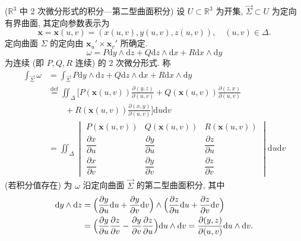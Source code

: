 \begin{definition}\label{def:11.3.4}
($\mathbb{R}^{3}$ 中 2 次微分形式的积分---第二型曲面积分) 设 $U\subset\mathbb{R}^{3}$ 为开集, $\overrightarrow{\Sigma}\subset U$ 为定向有界曲面, 其定向参数表示为
\[
\boldsymbol{x}=\boldsymbol{x}(u,v)=(x(u,v),y(u,v),z(u,v)),\quad(u,v)\in\Delta.
\]
定向曲面 $\Sigma$ 的定向由 $\boldsymbol{x}_{u}'\times\boldsymbol{x}_{v}'$ 所确定.
\[
\omega=P\mathrm{d}y\wedge\mathrm{d}z+Q\mathrm{d}z\wedge\mathrm{d}x+R\mathrm{d}x\wedge\mathrm{d}y
\]
为连续 (即 $P,Q,R$ 连续) 的 2 次微分形式. 称
\[
\begin{aligned}
\int_{\overrightarrow{\Sigma}}\omega&=\int_{\overrightarrow{\Sigma}}P\mathrm{d}y\wedge\mathrm{d}z+Q\mathrm{d}z\wedge\mathrm{d}x+R\mathrm{d}x\wedge\mathrm{d}y\\
&\overset{\text{def}}{=}\iint_{\Delta}\Biggl[P(\boldsymbol{x}(u,v))\frac{\partial(y,z)}{\partial(u,v)}+Q(\boldsymbol{x}(u,v))\frac{\partial(z,x)}{\partial(u,v)}\\
&\qquad+R(\boldsymbol{x}(u,v))\frac{\partial(x,y)}{\partial(u,v)}\Biggr]\mathrm{d}u\mathrm{d}v\\
&=\iint_{\Delta}
\begin{vmatrix}
P(\boldsymbol{x}(u,v))&Q(\boldsymbol{x}(u,v))&R(\boldsymbol{x}(u,v))\\
\dfrac{\partial x}{\partial u}&\dfrac{\partial y}{\partial u}&\dfrac{\partial z}{\partial u}\\[4pt]
\dfrac{\partial x}{\partial v}&\dfrac{\partial y}{\partial v}&\dfrac{\partial z}{\partial v}
\end{vmatrix}\mathrm{d}u\mathrm{d}v
\end{aligned}
\]
(若积分值存在) 为 $\omega$ 沿定向曲面 $\overrightarrow{\Sigma}$ 的第二型曲面积分, 其中
\[
\begin{aligned}
\mathrm{d}y\wedge\mathrm{d}z&=\Bigl(\frac{\partial y}{\partial u}\mathrm{d}u+\frac{\partial y}{\partial v}\mathrm{d}v\Bigr)\wedge\Bigl(\frac{\partial z}{\partial u}\mathrm{d}u+\frac{\partial z}{\partial v}\mathrm{d}v\Bigr)\\
&=\Bigl(\frac{\partial y}{\partial u}\frac{\partial z}{\partial v}-\frac{\partial y}{\partial v}\frac{\partial z}{\partial u}\Bigr)\mathrm{d}u\wedge\mathrm{d}v=\frac{\partial(y,z)}{\partial(u,v)}\mathrm{d}u\wedge\mathrm{d}v.
\end{aligned}
\]
\end{definition}

